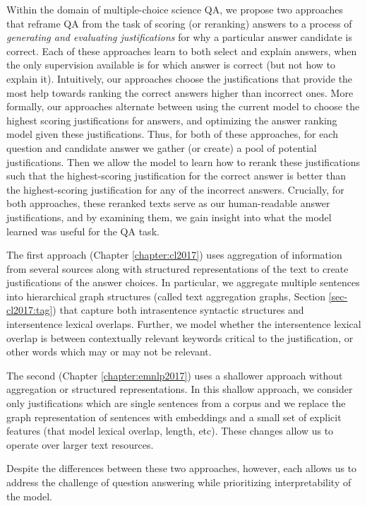 Within the domain of multiple-choice science QA, we propose two approaches that reframe QA from the task of scoring (or reranking) answers to a process of \emph{generating and evaluating justifications} for why a particular answer candidate is correct.  
Each of these approaches learn to both select and explain answers, when the only supervision available is for which answer is correct (but not how to explain it).
Intuitively, our approaches choose the justifications that provide the most help towards ranking the correct answers higher than incorrect ones.  
More formally, our approaches alternate between using the current model to choose the highest scoring justifications for answers, and optimizing the answer ranking model given these justifications. 
Thus, for both of these approaches, for each question and candidate answer we gather (or create) a pool of potential justifications.  Then we allow the model to learn how to rerank these justifications such that the highest-scoring justification for the correct answer is better than the highest-scoring justification for any of the incorrect answers.   
Crucially, for both approaches, these reranked texts serve as our human-readable answer justifications, and by examining them, we gain insight into what the model learned was useful for the QA task. 

The first approach (Chapter \ref{chapter:cl2017}) uses aggregation of information from several sources along with structured representations of the text to create justifications of the answer choices.  
In particular, we aggregate multiple sentences into hierarchical graph structures (called text aggregation graphs, Section \ref{sec-cl2017:tag}) that capture both intrasentence syntactic structures and intersentence lexical overlaps. 
Further, we model whether the intersentence lexical overlap is between contextually relevant keywords critical to the justification, or other words which may or may not be relevant. 

The second (Chapter \ref{chapter:emnlp2017}) uses a shallower approach without aggregation or structured representations.  In this shallow approach, we consider only justifications which are single sentences from a corpus and we replace the graph representation of sentences with embeddings and a small set of explicit features (that model lexical overlap, length, etc).  These changes allow us to operate over larger text resources.  

Despite the differences between these two approaches, however, each allows us to address the challenge of question answering while prioritizing interpretability of the model.

